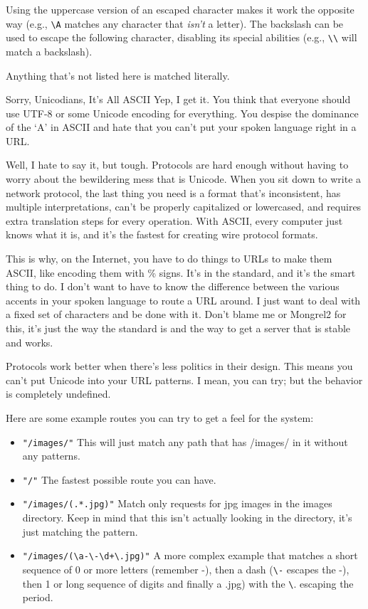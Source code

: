 Using the uppercase version of an escaped character makes it work the opposite
way (e.g., \verb|\A| matches any character that \emph{isn't} a letter). The backslash
can be used to escape the following character, disabling its special abilities (e.g.,
\verb|\\| will match a backslash).

Anything that's not listed here is matched literally.

\begin{aside}{Sorry, Unicodians, It's All ASCII}
Yep, I get it.  You think that everyone should use UTF-8 or some Unicode encoding for everything.
You despise the dominance of the `A' in ASCII and hate that you can't put your spoken language
right in a URL.

Well, I hate to say it, but tough.  Protocols are hard enough without having to
worry about the bewildering mess that is Unicode.  When you sit down to write a
network protocol, the last thing you need is a format that's inconsistent, has
multiple interpretations, can't be properly capitalized or lowercased, and
requires extra translation steps for every operation.  With ASCII, every
computer just knows what it is, and it's the fastest for creating wire protocol
formats.

This is why, on the Internet, you have to do things to URLs to make them ASCII,
like encoding them with \% signs.  It's in the standard, and it's the smart
thing to do.  I don't want to have to know the difference between the various
accents in your spoken language to route a URL around.  I just want to deal
with a fixed set of characters and be done with it.  Don't blame me or Mongrel2
for this, it's just the way the standard is and the way to get a server that is
stable and works.

Protocols work better when there's less politics in their design.  This means
you can't put Unicode into your URL patterns.  I mean, you can try; but the
behavior is completely undefined.
\end{aside}


Here are some example routes you can try to get a feel for the system:

\begin{itemize}
\item \verb|"/images/"|  This will just match any path that has /images/ in it without any patterns.
\item \verb|"/"| The fastest possible route you can have.
\item \verb|"/images/(.*.jpg)"| Match only requests for jpg images in the images directory.  Keep in mind that this
    isn't actually looking in the directory, it's just matching the  pattern.
\item \verb|"/images/(\a-\-\d+\.jpg)"| A more complex example that matches a short sequence of 0 or more letters (remember -), then a dash
    (\verb|\-| escapes the -), then 1 or long sequence of digits and finally a .jpg) with the \verb|\|. escaping the period.
\end{itemize}

